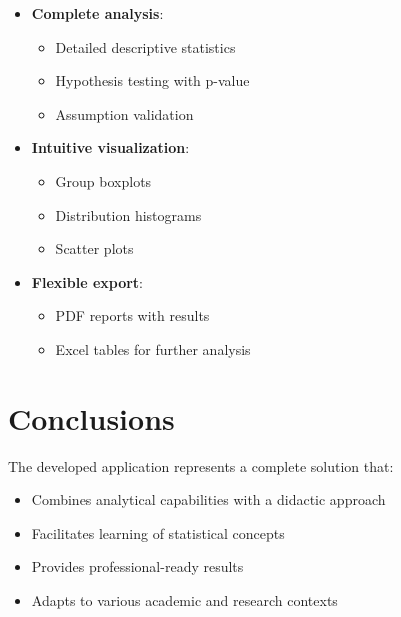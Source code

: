\documentclass[12pt]{article}
\begin{document}
\begin{itemize}
    \item \textbf{Complete analysis}:
    \begin{itemize}
        \item Detailed descriptive statistics
        \item Hypothesis testing with p-value
        \item Assumption validation
    \end{itemize}
    \item \textbf{Intuitive visualization}:
    \begin{itemize}
        \item Group boxplots
        \item Distribution histograms
        \item Scatter plots
    \end{itemize}
    \item \textbf{Flexible export}:
    \begin{itemize}
        \item PDF reports with results
        \item Excel tables for further analysis
    \end{itemize}
\end{itemize}

\section{Conclusions}
The developed application represents a complete solution that:

\begin{itemize}
    \item Combines analytical capabilities with a didactic approach
    \item Facilitates learning of statistical concepts
    \item Provides professional-ready results
    \item Adapts to various academic and research contexts
\end{itemize}
\end{document}
